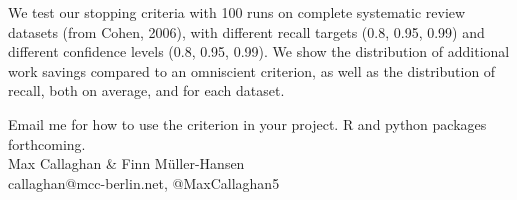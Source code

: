 \documentclass[a0paper,portrait]{baposter}
\begin{document}
\begin{poster}
{	%
	
	We test our stopping criteria with 100 runs on complete systematic review datasets (from Cohen, 2006), with different recall targets (0.8, 0.95, 0.99) and different confidence levels (0.8, 0.95, 0.99). We show the distribution of additional work savings compared to an omniscient criterion, as well as the distribution of recall, both on average, and for each dataset.
}








\begin{posterbox}[name=footer,span=2,column=0,above=bottom,boxheaderheight=0em,textborder=none]{}
{
	Email me for how to use the criterion in your project. R and python packages forthcoming. \\
	Max Callaghan \& Finn Müller-Hansen\\
{\smaller callaghan@mcc-berlin.net, @MaxCallaghan5}
}
\end{posterbox}








\end{poster}
\end{document}
